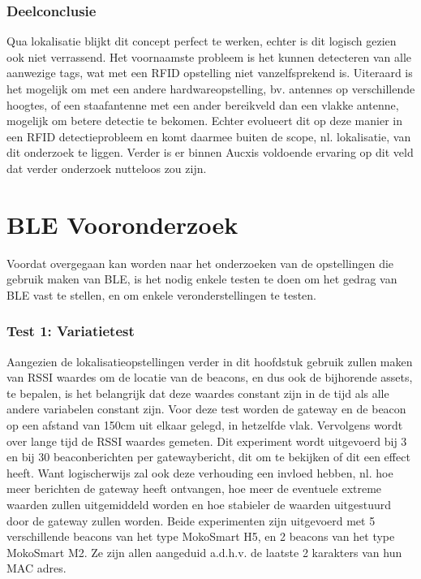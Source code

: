\subsubsection{Deelconclusie}
Qua lokalisatie blijkt dit concept perfect te werken, echter is dit logisch gezien ook niet verrassend. Het voornaamste probleem is het kunnen detecteren van alle aanwezige tags, wat met een RFID opstelling niet vanzelfsprekend is. Uiteraard is het mogelijk om met een andere hardwareopstelling, bv. antennes op verschillende hoogtes, of een staafantenne met een ander bereikveld dan een vlakke antenne, mogelijk om betere detectie te bekomen. Echter evolueert dit op deze manier in een RFID detectieprobleem en komt daarmee buiten de scope, nl. lokalisatie, van dit onderzoek te liggen. Verder is er binnen Aucxis voldoende ervaring op dit veld dat verder onderzoek nutteloos zou zijn.

\section{BLE Vooronderzoek}
Voordat overgegaan kan worden naar het onderzoeken van de opstellingen die gebruik maken van BLE, is het nodig enkele testen te doen om het gedrag van BLE vast te stellen, en om enkele veronderstellingen te testen.

\subsubsection{Test 1: Variatietest}
Aangezien de lokalisatieopstellingen verder in dit hoofdstuk gebruik zullen maken van RSSI waardes om de locatie van de beacons, en dus ook de bijhorende assets, te bepalen, is het belangrijk dat deze waardes constant zijn in de tijd als alle andere variabelen constant zijn. 
Voor deze test worden de gateway en de beacon op een afstand van 150cm uit elkaar gelegd, in hetzelfde vlak. Vervolgens wordt over lange tijd de RSSI waardes gemeten. Dit experiment wordt uitgevoerd bij 3 en bij 30 beaconberichten per gatewaybericht, dit om te bekijken of dit een effect heeft. Want logischerwijs zal ook deze verhouding een invloed hebben, nl. hoe meer berichten de gateway heeft ontvangen, hoe meer de eventuele extreme waarden zullen uitgemiddeld worden en hoe stabieler de waarden uitgestuurd door de gateway zullen worden.
Beide experimenten zijn uitgevoerd met 5 verschillende beacons van het type MokoSmart H5, en 2 beacons van het type MokoSmart M2. Ze zijn allen aangeduid a.d.h.v. de laatste 2 karakters van hun MAC adres.

